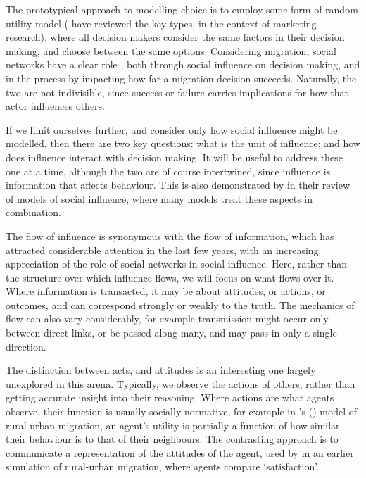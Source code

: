 \documentclass{article}
\begin{document}
The prototypical approach to modelling choice is to employ some form of random utility model (\citet{Baltas2001} have reviewed the key types, in the context of marketing research), where all decision makers consider the same factors in their decision making, and choose between the same options. Considering migration, social networks have a clear role \citep{Epstein2006}, both through social influence on decision making, and in the process by impacting how far a migration decision succeeds. Naturally, the two are not indivisible, since success or failure carries implications for how that actor influences others.

If we limit ourselves further, and consider only how social influence might be modelled, then there are two key questions: what is the unit of influence; and how does influence interact with decision making. It will be useful to address these one at a time, although the two are of course intertwined, since influence is information that affects behaviour. This is also demonstrated by \citet{Mason2007} in their review of models of social influence, where many models treat these aspects in combination.

The flow of influence is synonymous with the flow of information, which has attracted considerable attention in the last few years, with an increasing appreciation of the role of social networks in social influence. Here, rather than the structure over which influence flows, we will focus on what flows over it. 
Where information is transacted, it may be about attitudes, or actions, or outcomes, and can correspond strongly or weakly to the truth. The mechanics of flow can also vary considerably, for example transmission might occur only between direct links, or be passed along many, and may pass in only a single direction.

The distinction between acts, and attitudes is an interesting one largely unexplored in this arena. Typically, we observe the actions of others, rather than getting accurate insight into their reasoning. Where actions are what agents observe, their function is usually socially normative, for example in \citeauthor{Silveira2005}'s (\citeyear{Silveira2005}) model of rural-urban migration, an agent's utility is partially a function of how similar their behaviour is to that of their neighbours. The contrasting approach is to communicate a representation of the attitudes of the agent, used by \citet{Espindola2006} in an earlier simulation of rural-urban migration, where agents compare `satisfaction'.
\end{document}
